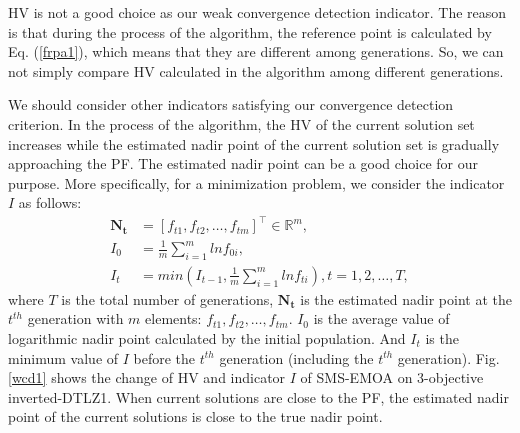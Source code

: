 \documentclass[conference]{IEEEtran}
\begin{document}
HV is not a good choice as our weak convergence detection indicator. 
The reason is that during the process of the algorithm, the reference point is calculated by Eq. (\ref{frpa1}), 
which means that they are different among generations. 
So, we can not simply compare HV calculated in the algorithm among different generations. 

We should consider other indicators satisfying our convergence detection criterion. 
In the process of the algorithm, the HV of the current solution set increases 
while the estimated nadir point of the current solution set is gradually approaching the PF. 
The estimated nadir point can be a good choice for our purpose. 
More specifically,
for a minimization problem, we consider the indicator $I$ as follows:
\begin{equation}\begin{aligned}\label{ewcd1}
  \boldsymbol{N_{t}} &= [f_{t1},f_{t2},\dots,f_{tm}]^\top \in \mathbb{R}^m ,\\
  I_{0} &= \frac{1}{m} \sum_{i=1}^{m}lnf_{0i},\\
  I_{t} &= min(I_{t-1},\frac{1}{m} \sum_{i=1}^{m}lnf_{ti}),
  t = 1,2,\dots,T,
\end{aligned}
\end{equation}
where $T$ is the total number of generations, 
$\boldsymbol{N_{t}}$ is the estimated nadir point at the $t^{th}$ generation with $m$ elements: $f_{t1},f_{t2},\dots,f_{tm}$. 
$I_0$ is the average value of logarithmic nadir point calculated by the initial population.
And $I_t$ is the minimum value of $I$ before the $t^{th}$ generation (including the $t^{th}$ generation). 
Fig. \ref{wcd1} shows the change of HV and indicator $I$ of SMS-EMOA on 3-objective inverted-DTLZ1.
When current solutions are close to the PF, the estimated nadir point of the current solutions is close 
to the true nadir point. 
\end{document}

